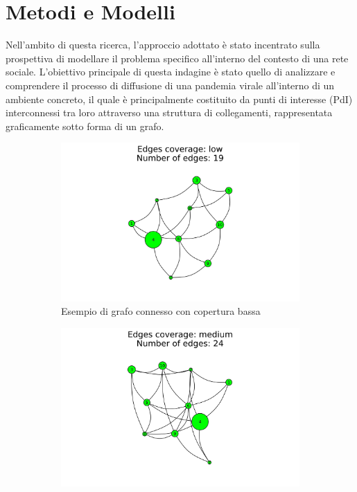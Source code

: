 \section{Metodi e Modelli}

Nell'ambito di questa ricerca, l'approccio adottato è stato incentrato 
sulla prospettiva di modellare il problema specifico all'interno del 
contesto di una rete sociale. L'obiettivo principale di questa indagine 
è stato quello di analizzare e comprendere il processo di diffusione di 
una pandemia virale all'interno di un ambiente concreto, il quale è 
principalmente costituito da punti di interesse (PdI) interconnessi tra 
loro attraverso una struttura di collegamenti, rappresentata graficamente 
sotto forma di un grafo. 

\begin{figure}[H]
	\centering
	\begin{subfigure}[b]{0.3\textwidth}
		\centering
		\includegraphics[width=\textwidth]{img/low.jpg}
		\caption{Esempio di grafo connesso con copertura bassa}
		\label{fig:connected_graph_example_low}
	\end{subfigure}
	\hfill
	\begin{subfigure}[b]{0.3\textwidth}
		\centering
		\includegraphics[width=\textwidth]{img/medium.jpg}

\end{subfigure}
\end{figure}

